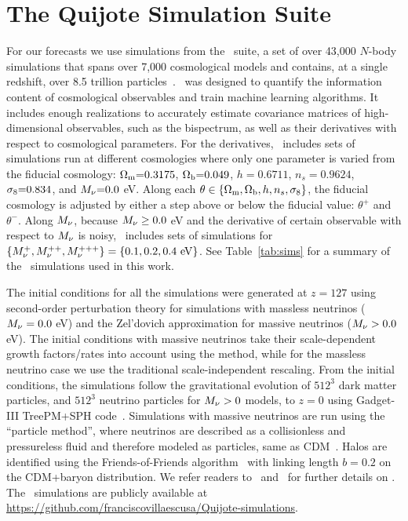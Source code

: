\section{The Quijote Simulation Suite} \label{sec:sims}
For our forecasts we use simulations from the \quij~suite, a set of over 43,000 
$N$-body simulations that spans over 7,000 cosmological models and contains, at a single 
redshift, over 8.5 trillion particles~\citep{villaescusa-navarro2020a}. 
\quij~was designed to quantify the information content of cosmological 
observables and train machine learning algorithms. It includes enough
realizations to accurately estimate covariance matrices 
of high-dimensional observables, such as the bispectrum, as well as their derivatives 
with respect to cosmological parameters. For the derivatives, 
\quij~includes sets of simulations run at different cosmologies where only 
one parameter is varied from the fiducial cosmology:
$\Omega_{\rm m}{=}0.3175$, $\Omega_{\rm b}{=}0.049$, $h{=}0.6711$, $n_s{=}0.9624$, $\sigma_8{=}0.834$, 
and $M_\nu{=}0.0$ eV. Along each $\theta \in \{\Omega_{\rm m}, \Omega_{\rm b}, h, n_s, \sigma_8\}$, the fiducial 
cosmology is adjusted by either a step above or below the fiducial value:
$\theta^{+}$ and $\theta^{-}$. 
Along $M_\nu$, because $M_\nu \ge 0.0$ eV and the derivative of certain observable 
with respect to $M_\nu$ is noisy, \quij~includes sets of simulations for 
$\{M_\nu^{+}, M_\nu^{++}, M_\nu^{+++} \} = \{0.1, 0.2, 0.4~{\rm eV}\}$. See 
Table~\ref{tab:sims} for a summary of the \quij~simulations used in this work. 

The initial conditions for all the simulations were generated at $z{=}127$ using 
second-order perturbation theory for simulations with massless neutrinos 
($M_\nu = 0.0$ eV) and the Zel’dovich approximation for massive neutrinos 
($M_\nu > 0.0$ eV). The initial conditions with massive neutrinos take 
their scale-dependent growth factors/rates into account using the 
\cite{zennaro2017a} method, while for the massless neutrino case we use 
the traditional scale-independent rescaling. From the initial conditions, 
the simulations follow the gravitational evolution of $512^3$ dark matter
particles, and $512^3$ neutrino particles for $M_\nu > 0$ models, to 
$z=0$ using {\sc Gadget-III} TreePM+SPH code~\citep{springel2005}. Simulations 
with massive neutrinos are run using the ``particle method'', where neutrinos 
are described as a collisionless and pressureless fluid and therefore modeled 
as particles, same as CDM~\citep{brandbyge2008,viel2010}. Halos are identified 
using the Friends-of-Friends algorithm~\citep[FoF;][]{davis1985} with linking
length $b=0.2$ on the CDM+baryon distribution. 
We refer readers to~\cite{villaescusa-navarro2020a}
and~\cite{hahn2020} for further details on \quij. The
\quij~simulations are publicly available at
\url{https://github.com/franciscovillaescusa/Quijote-simulations}.

